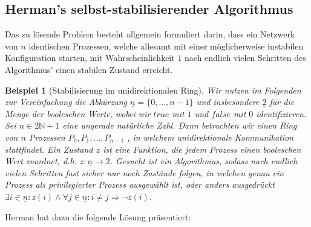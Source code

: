 \documentclass[a4paper]{article}
\newtheorem{beispiel}[satz]{Beispiel}
\theoremstyle{nonumberplain}
\begin{document}
\subsection{Herman's selbst-stabilisierender Algorithmus}

Das zu lösende Problem besteht allgemein formuliert darin, dass ein Netzwerk von $n$ identischen Prozessen, welche allesamt mit einer möglicherweise instabilen Konfiguration starten, mit Wahrscheinlichkeit $1$ nach endlich vielen Schritten des Algorithmus' einen stabilen Zustand erreicht.

\begin{beispiel}[Stabilisierung im unidirektionalen Ring]
	\hspace{0.5em} Wir nutzen im Folgenden zur Vereinfachung die Abkürzung $\underline{n} = \{0,\dots,n-1\}$ und insbesondere $\underline{2}$ für die Menge der booleschen Werte, wobei wir $true$ mit $1$ und $false$ mit $0$ identifizieren.
	Sei $n \in 2\mathbb{N}+1$ eine ungerade natürliche Zahl. Dann betrachten wir einen Ring von $n$ Prozessen $P_0, P_1, \dots, P_{n-1}$ , in welchem unidirektionale Kommunikation stattfindet. Ein Zustand $z$ ist eine Funktion, die jedem Prozess einen booleschen Wert zuordnet, d.h. $z : \underline{n} \to 2$.
	Gesucht ist ein Algorithmus, sodass nach endlich vielen Schritten fast sicher nur noch Zustände folgen, in welchen genau ein Prozess als privilegierter Prozess ausgewählt ist, oder anders ausgedrückt $\exists i \in \underline{n} : z(i) \land \forall j \in \underline{n}: i\neq j \Rightarrow \neg z(i)$.
\end{beispiel}

Herman hat dazu die folgende Lösung präsentiert:
\end{document}
